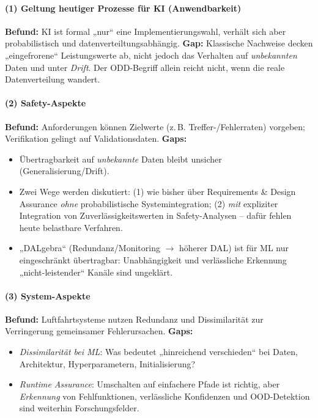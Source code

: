 \paragraph{(1) Geltung heutiger Prozesse für KI (Anwendbarkeit)}
\textbf{Befund:} KI ist formal „nur“ eine Implementierungswahl, verhält sich aber probabilistisch und datenverteiltungsabhängig.  
\textbf{Gap:} Klassische Nachweise decken „eingefrorene“ Leistungswerte ab, nicht jedoch das Verhalten auf \emph{unbekannten} Daten und unter \emph{Drift}. Der ODD-Begriff allein reicht nicht, wenn die reale Datenverteilung wandert.

\paragraph{(2) Safety-Aspekte}
\textbf{Befund:} Anforderungen können Zielwerte (z.\,B. Treffer-/Fehlerraten) vorgeben; Verifikation gelingt auf Validationsdaten.  
\textbf{Gaps:} 
\begin{itemize}
  \item Übertragbarkeit auf \emph{unbekannte} Daten bleibt unsicher (Generalisierung/Drift).
  \item Zwei Wege werden diskutiert: (1) wie bisher über Requirements \& Design Assurance \emph{ohne} probabilistische Systemintegration; (2) \emph{mit} expliziter Integration von Zuverlässigkeitswerten in Safety-Analysen – dafür fehlen heute belastbare Verfahren.
  \item „DALgebra“ (Redundanz/Monitoring \(\rightarrow\) höherer DAL) ist für ML nur eingeschränkt übertragbar: Unabhängigkeit und verlässliche Erkennung „nicht-leistender“ Kanäle sind ungeklärt.
\end{itemize}

\paragraph{(3) System-Aspekte}
\textbf{Befund:} Luftfahrtsysteme nutzen Redundanz und Dissimilarität zur Verringerung gemeinsamer Fehlerursachen.  
\textbf{Gaps:}
\begin{itemize}
  \item \textit{Dissimilarität bei ML}: Was bedeutet „hinreichend verschieden“ bei Daten, Architektur, Hyperparametern, Initialisierung?
  \item \textit{Runtime Assurance}: Umschalten auf einfachere Pfade ist richtig, aber \emph{Erkennung} von Fehlfunktionen, verlässliche Konfidenzen und OOD-Detektion sind weiterhin Forschungsfelder.
\end{itemize}


